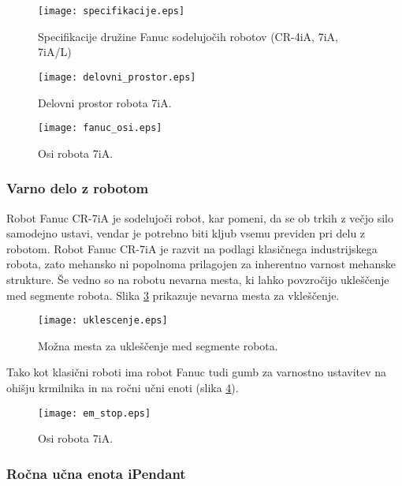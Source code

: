 \begin{figure}[!hbt]
	\centering
	\texttt{[image: specifikacije.eps]}
	\caption{Specifikacije družine Fanuc sodelujočih robotov (CR-4iA, 7iA, 7iA/L)}
	\label{fig:specifikacije}
\end{figure}

\begin{figure}[!hbt]
	\centering
	\begin{minipage}{0.5\textwidth}
		\centering
		\texttt{[image: delovni\_prostor.eps]}
		\caption{Delovni prostor robota 7iA.}
		\label{fig:delovni_prostor}
    \end{minipage}\hfill
	\begin{minipage}{0.5\textwidth}
		\centering
		\texttt{[image: fanuc\_osi.eps]}
		\caption{Osi robota 7iA.}
		\label{fig:fanuc_osi}
	\end{minipage}
\end{figure}

\newpage

\subsubsection{Varno delo z robotom}

Robot Fanuc CR-7iA je sodelujoči robot, kar pomeni, da se ob trkih z večjo silo samodejno ustavi, vendar je potrebno biti kljub vsemu previden pri delu z robotom. Robot Fanuc CR-7iA je razvit na podlagi klasičnega industrijskega robota, zato mehansko ni popolnoma prilagojen za inherentno varnost mehanske strukture. Še vedno so na robotu nevarna mesta, ki lahko povzročijo ukleščenje med segmente robota. Slika \ref{fig:uklescenje} prikazuje nevarna mesta za vkleščenje.

\begin{figure}[!hbt]
	\centering
	\texttt{[image: uklescenje.eps]}
	\caption{Možna mesta za ukleščenje med segmente robota.}
	\label{fig:uklescenje}
\end{figure}

Tako kot klasični roboti ima robot Fanuc tudi gumb za varnostno ustavitev na ohišju krmilnika in na ročni učni enoti (slika \ref{fig:em_stop}).

\begin{figure}[!hbt]
	\centering
	\texttt{[image: em\_stop.eps]}
	\caption{Osi robota 7iA.}
	\label{fig:em_stop}
\end{figure}

\subsubsection{Ročna učna enota iPendant}

